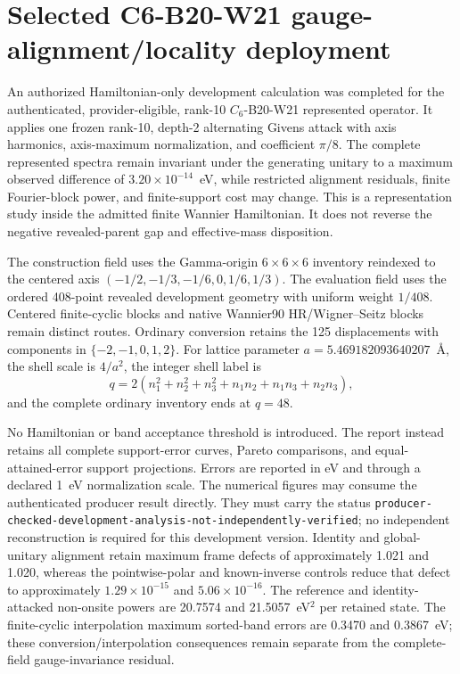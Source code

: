 \documentclass[11pt]{article}
\begin{document}
\section{Selected C6-B20-W21 gauge-alignment/locality deployment}

An authorized Hamiltonian-only development calculation was completed for the
authenticated, provider-eligible, rank-10 \(C_6\)-B20-W21 represented operator.  It
applies one frozen
rank-10, depth-2 alternating Givens attack with axis harmonics, axis-maximum
normalization, and coefficient \(\pi/8\).  The complete represented spectra remain
invariant under the generating unitary to a maximum observed difference of
\(3.20\times10^{-14}\)~eV, while restricted alignment residuals,
finite Fourier-block power, and finite-support cost may change.  This is a representation
study inside the admitted finite Wannier Hamiltonian.  It does not reverse the negative
revealed-parent gap and effective-mass disposition.

The construction field uses the Gamma-origin \(6\times6\times6\) inventory reindexed
to the centered axis
\((-1/2,-1/3,-1/6,0,1/6,1/3)\).  The evaluation field uses the ordered 408-point
revealed development geometry with uniform weight \(1/408\).  Centered finite-cyclic
blocks and native Wannier90 HR/Wigner--Seitz blocks remain distinct routes.  Ordinary
conversion retains the 125 displacements with components in
\(\{-2,-1,0,1,2\}\).  For lattice parameter
\(a=5.469182093640207\)~\AA, the shell scale is \(4/a^2\), the integer shell label is
\begin{equation}
  q=2\left(n_1^2+n_2^2+n_3^2+n_1n_2+n_1n_3+n_2n_3\right),
\end{equation}
and the complete ordinary inventory ends at \(q=48\).

No Hamiltonian or band acceptance threshold is introduced.  The report instead retains
all complete support-error curves, Pareto comparisons, and equal-attained-error support
projections.  Errors are reported in eV and through a declared 1~eV normalization scale.
The numerical figures may consume the authenticated producer result directly.  They
must carry the status
\texttt{producer-checked-development-analysis-not-independently-verified}; no
independent reconstruction is required for this development version.  Identity and
global-unitary alignment retain maximum frame defects of approximately 1.021 and
1.020, whereas the pointwise-polar and known-inverse controls reduce that defect to
approximately \(1.29\times10^{-15}\) and \(5.06\times10^{-16}\).  The reference and
identity-attacked non-onsite powers are 20.7574 and 21.5057~eV\(^2\) per retained state.
The finite-cyclic interpolation maximum sorted-band errors are 0.3470 and 0.3867~eV;
these conversion/interpolation consequences remain separate from the complete-field
gauge-invariance residual.
\end{document}
